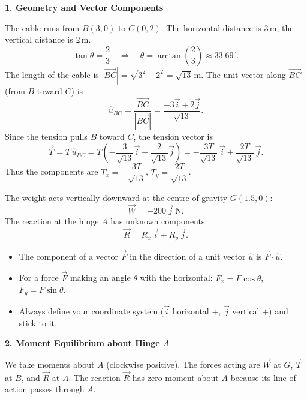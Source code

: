 \documentclass[11pt]{article}
\newcounter{popsec}
\newcounter{popsub}
\newcommand{\courssub}[1]{%
  \stepcounter{popsub}%
  \par\vspace{9pt}\noindent{\popxbold\fontsize{11.5}{13}\selectfont\color{popink}{\color{poporange}\thepopsec.\thepopsub}\hspace{6pt}#1}\par\nopagebreak\vspace{4pt}
}
\begin{document}
\courssub{Guided Solution}

\textbf{1. Geometry and Vector Components}\par
The cable runs from $B(3,0)$ to $C(0,2)$. The horizontal distance is $3\,\mathrm{m}$, the vertical distance is $2\,\mathrm{m}$.
\[
\tan\theta = \frac{2}{3} \quad\Rightarrow\quad \theta = \arctan\left(\frac{2}{3}\right) \approx 33.69^\circ.
\]
The length of the cable is $|\vec{BC}| = \sqrt{3^2+2^2} = \sqrt{13}\,\mathrm{m}$.
The unit vector along $\vec{BC}$ (from $B$ toward $C$) is
\[
\hat{u}_{BC} = \frac{\vec{BC}}{|\vec{BC}|} = \frac{-3\vec{i} + 2\vec{j}}{\sqrt{13}}.
\]
Since the tension pulls $B$ toward $C$, the tension vector is
\[
\vec{T} = T\,\hat{u}_{BC} = T\left(-\frac{3}{\sqrt{13}}\vec{i} + \frac{2}{\sqrt{13}}\vec{j}\right)
= -\frac{3T}{\sqrt{13}}\,\vec{i} + \frac{2T}{\sqrt{13}}\,\vec{j}.
\]
Thus the components are $T_x = -\dfrac{3T}{\sqrt{13}}$, $T_y = \dfrac{2T}{\sqrt{13}}$.

The weight acts vertically downward at the centre of gravity $G(1.5,0)$:
\[
\vec{W} = -200\,\vec{j}\ \mathrm{N}.
\]
The reaction at the hinge $A$ has unknown components:
\[
\vec{R} = R_x\,\vec{i} + R_y\,\vec{j}.
\]

\begin{aretenir}
\begin{itemize}
\item The component of a vector $\vec{F}$ in the direction of a unit vector $\hat{u}$ is $\vec{F}\cdot\hat{u}$.
\item For a force $\vec{F}$ making an angle $\theta$ with the horizontal: $F_x = F\cos\theta$, $F_y = F\sin\theta$.
\item Always define your coordinate system ($\vec{i}$ horizontal $+$, $\vec{j}$ vertical $+$) and stick to it.
\end{itemize}
\end{aretenir}

\textbf{2. Moment Equilibrium about Hinge $A$}\par
We take moments about $A$ (clockwise positive). The forces acting are $\vec{W}$ at $G$, $\vec{T}$ at $B$, and $\vec{R}$ at $A$. The reaction $\vec{R}$ has zero moment about $A$ because its line of action passes through $A$.
\end{document}
